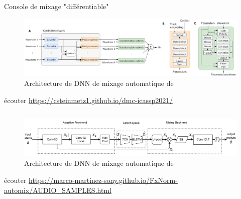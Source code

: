 \documentclass[9pt, aspectratio=169]{beamer}
\begin{document}
\begin{frame}{Console de mixage "différentiable"} %

\begin{figure}
	\includegraphics[width=\textwidth]{fig/steinmetz2021_diffmix.png}
	\caption{Architecture de DNN de mixage automatique de \cite{steinmetz_automatic_2020}}
\end{figure}
écouter \url{https://csteinmetz1.github.io/dmc-icassp2021/}

\begin{columns}
    \begin{column}{0.48\textwidth}
    \end{column}
    \begin{column}{0.48\textwidth}
    \end{column}
\end{columns}
\end{frame}

\begin{frame}{} %

\begin{figure}
	\includegraphics[width=\textwidth]{fig/martinez_ramirez2022_architecture.png}
	\caption{Architecture de DNN de mixage automatique de \cite{martinez-ramirez_automatic_2022}}
\end{figure}
écouter \url{https://marco-martinez-sony.github.io/FxNorm-automix/AUDIO_SAMPLES.html}

\begin{columns}
    \begin{column}{0.48\textwidth}
    \end{column}
    \begin{column}{0.48\textwidth}
    \end{column}
\end{columns}
\end{frame}
\end{document}
